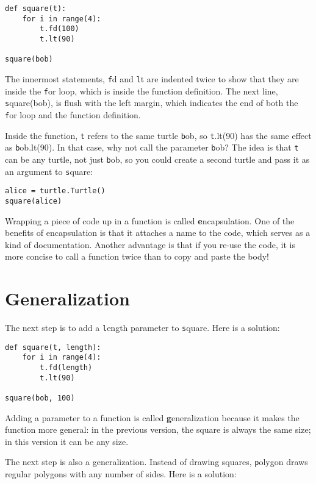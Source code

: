 \documentclass[
DIV=11,
fontsize=12,
twoside,
headinclude=false,
titlepage=firstiscover,
abstract=true,
headsepline=true,
footsepline=true,
chapterprefix=true, %
headings=big,
bibliography=totoc,%
captions=tableheading
]{scrbook}
\theoremstyle{definition}
\begin{document}
\begin{lstlisting}
def square(t):
    for i in range(4):
        t.fd(100)
        t.lt(90)

square(bob)
\end{lstlisting}
%
The innermost statements, {\texttt fd} and {\texttt lt} are indented twice to
show that they are inside the {\texttt for} loop, which is inside the
function definition.  The next line, {\texttt square(bob)}, is flush with
the left margin, which indicates the end of both the {\texttt for} loop
and the function definition.

Inside the function, {\texttt t} refers to the same turtle {\texttt bob}, so
{\texttt t.lt(90)} has the same effect as {\texttt bob.lt(90)}.  In that
case, why not
call the parameter {\texttt bob}?  The idea is that {\texttt t} can be any
turtle, not just {\texttt bob}, so you could create a second turtle and
pass it as an argument to {\texttt square}:

\begin{lstlisting}
alice = turtle.Turtle()
square(alice)
\end{lstlisting}
%
Wrapping a piece of code up in a function is called {\textbf
encapsulation}.  One of the benefits of encapsulation is that it
attaches a name to the code, which serves as a kind of documentation.
Another advantage is that if you re-use the code, it is more concise
to call a function twice than to copy and paste the body!


\section{Generalization}

The next step is to add a {\texttt length} parameter to {\texttt square}.
Here is a solution:

\begin{lstlisting}
def square(t, length):
    for i in range(4):
        t.fd(length)
        t.lt(90)

square(bob, 100)
\end{lstlisting}
%
Adding a parameter to a function is called {\textbf generalization}
because it makes the function more general: in the previous
version, the square is always the same size; in this version
it can be any size.

The next step is also a generalization.  Instead of drawing
squares, {\texttt polygon} draws regular polygons with any number of
sides.  Here is a solution:
\end{document}
